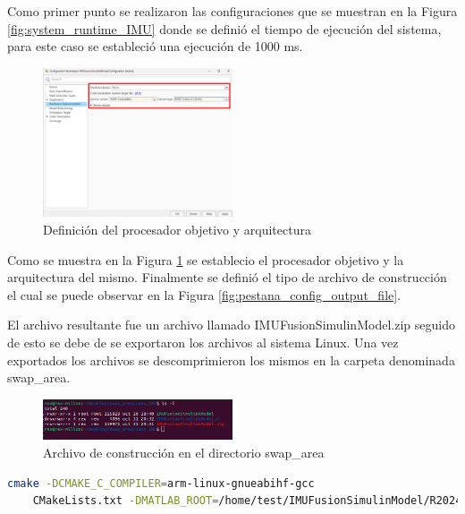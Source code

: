 Como primer punto se realizaron las configuraciones que se muestran en la Figura \ref{fig:system_runtime_IMU} donde se definió el tiempo de ejecución del sistema, para este caso se estableció una ejecución de 1000 ms. 

\begin{figure}[h!]
    \centering
    \includegraphics[width=0.5\textwidth]{fig/aditional/procesador_imu.pdf}
    \caption{Definición del procesador objetivo y arquitectura}
    \label{fig:system_target_IMU}
\end{figure}

Como se muestra en la Figura \ref{fig:system_target_IMU} se establecio el procesador objetivo y la arquitectura del mismo. Finalmente se definió el tipo de archivo de construcción el cual se puede observar en la Figura \ref{fig:pestana_config_output_file}. 

El archivo resultante fue un archivo llamado IMUFusionSimulinModel.zip seguido de esto se debe de  se exportaron los archivos al sistema Linux. Una vez exportados los archivos se descomprimieron los mismos en la carpeta denominada swap\_area.

\begin{figure}[h!]
    \centering
    \includegraphics[width=0.5\textwidth]{fig/Capitulo5/Caso_de_estudio_IMU/retornos_consola/Screenshot from 2024-10-31 20-33-27.png}
    \caption{Archivo de construcción en el directorio swap\_area}
    \label{fig:swap_area_imu}
\end{figure}

\begin{lstlisting}[language=bash, caption={Compilacion del programa , Linux}, label=lst:build_cmake_file_IMU]
    cmake -DCMAKE_C_COMPILER=arm-linux-gnueabihf-gcc 
    CMakeLists.txt -DMATLAB_ROOT=/home/test/IMUFusionSimulinModel/R2024b/
\end{lstlisting}

